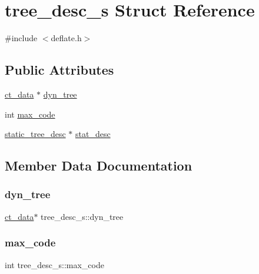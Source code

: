 \hypertarget{structtree__desc__s}{}\section{tree\+\_\+desc\+\_\+s Struct Reference}
\label{structtree__desc__s}


{\ttfamily \#include $<$deflate.\+h$>$}

\subsection*{Public Attributes}
\begin{DoxyCompactItemize}
\item 
\hyperlink{deflate_8h_a0a4b5df3b2254c627b8a59e038963118}{ct\+\_\+data} $\ast$ \hyperlink{structtree__desc__s_a5c79989c018b96c729e88e41f98a4920}{dyn\+\_\+tree}
\item 
int \hyperlink{structtree__desc__s_a11f42f2c0464693def462dcfdd871002}{max\+\_\+code}
\item 
\hyperlink{deflate_8h_a905910aabf6aabbe79ff0832e4a664cc}{static\+\_\+tree\+\_\+desc} $\ast$ \hyperlink{structtree__desc__s_a7f237428776ee85058bb7f7f11900dd2}{stat\+\_\+desc}
\end{DoxyCompactItemize}


\subsection{Member Data Documentation}
\mbox{\label{structtree__desc__s_a5c79989c018b96c729e88e41f98a4920}} 
\subsubsection{\texorpdfstring{dyn\+\_\+tree}{dyn\_tree}}
{\footnotesize\ttfamily \hyperlink{deflate_8h_a0a4b5df3b2254c627b8a59e038963118}{ct\+\_\+data}$\ast$ tree\+\_\+desc\+\_\+s\+::dyn\+\_\+tree}

\mbox{\label{structtree__desc__s_a11f42f2c0464693def462dcfdd871002}} 
\subsubsection{\texorpdfstring{max\+\_\+code}{max\_code}}
{\footnotesize\ttfamily int tree\+\_\+desc\+\_\+s\+::max\+\_\+code}

